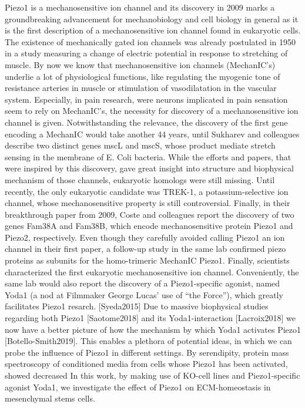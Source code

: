 Piezo1 is a mechanosensitive ion channel and its discovery in 2009 marks a groundbreaking advancement for mechanobiology and cell biology in general as it is the first description of a mechanosensitive ion channel found in eukaryotic cells. The existence of mechanically gated ion channels was already postulated in 1950 in a study measuring a change of electric potential in response to stretching of muscle. By now we know that mechanosensitive ion channels (MechanIC’s) underlie a lot of physiological functions, like regulating the myogenic tone of resistance arteries in muscle or stimulation of vasodilatation in the vascular system. Especially, in pain research, were neurons implicated in pain sensation seem to rely on MechanIC’s, the necessity for discovery of a mechanosensitive ion channel is given. Notwithstanding the relevance, the discovery of the first gene encoding a MechanIC would take another 44 years, until Sukharev and colleagues describe two distinct genes mscL and mscS, whose product mediate stretch sensing in the membrane of E. Coli bacteria. While the efforts and papers, that were inspired by this discovery, gave great insight into structure and biophysical mechanism of those channels, eukaryotic homologs were still missing. Until recently, the only eukaryotic candidate was TREK-1, a potassium-selective ion channel, whose mechanosensitive property is still controversial. Finally, in their breakthrough paper from 2009, Coste and colleagues report the discovery of two genes Fam38A and Fam38B, which encode mechanosensitive protein Piezo1 and Piezo2, respectively. Even though they carefully avoided calling Piezo1 an ion channel in their first paper, a follow-up study in the same lab confirmed piezo proteins as subunits for the homo-trimeric MechanIC Piezo1. Finally, scientists characterized the first eukaryotic mechanosensitive ion channel. Conveniently, the same lab would also report the discovery of a Piezo1-specific agonist, named Yoda1 (a nod at Filmmaker George Lucas’ use of “the Force”), which greatly facilitates Piezo1 resarch. [Syeda2015] Due to massive biophysical studies regarding both Piezo1 [Saotome2018] and its Yoda1-interaction [Lacroix2018] we now have a better picture of how the mechanism by which Yoda1 activates Piezo1 [Botello-Smith2019]. This enables a plethora of potential ideas, in which we can probe the influence of Piezo1 in different settings.
By serendipity, protein mass spectroscopy of conditioned media from cells whose Piezo1 has been activated, showed decreased In this work, by making use of KO-cell lines and Piezo1-specific agonist Yoda1, we investigate the effect of Piezo1 on ECM-homeostasis in mesenchymal stems cells.

